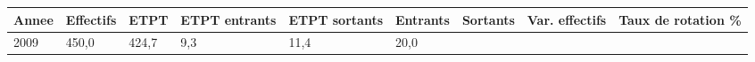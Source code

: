 \begin{longtable}[]{@{}lllllllll@{}}
\toprule
\begin{minipage}[b]{0.05\columnwidth}\raggedright
Annee\strut
\end{minipage} & \begin{minipage}[b]{0.08\columnwidth}\raggedright
Effectifs\strut
\end{minipage} & \begin{minipage}[b]{0.05\columnwidth}\raggedright
ETPT\strut
\end{minipage} & \begin{minipage}[b]{0.10\columnwidth}\raggedright
ETPT entrants\strut
\end{minipage} & \begin{minipage}[b]{0.10\columnwidth}\raggedright
ETPT sortants\strut
\end{minipage} & \begin{minipage}[b]{0.07\columnwidth}\raggedright
Entrants\strut
\end{minipage} & \begin{minipage}[b]{0.07\columnwidth}\raggedright
Sortants\strut
\end{minipage} & \begin{minipage}[b]{0.11\columnwidth}\raggedright
Var. effectifs\strut
\end{minipage} & \begin{minipage}[b]{0.14\columnwidth}\raggedright
Taux de rotation \%\strut
\end{minipage}\tabularnewline
\midrule
\endhead
\begin{minipage}[t]{0.05\columnwidth}\raggedright
2009\strut
\end{minipage} & \begin{minipage}[t]{0.08\columnwidth}\raggedright
450,0\strut
\end{minipage} & \begin{minipage}[t]{0.05\columnwidth}\raggedright
424,7\strut
\end{minipage} & \begin{minipage}[t]{0.10\columnwidth}\raggedright
9,3\strut
\end{minipage} & \begin{minipage}[t]{0.10\columnwidth}\raggedright
11,4\strut
\end{minipage} & \begin{minipage}[t]{0.07\columnwidth}\raggedright
20,0\strut
\end{minipage} & \begin{minipage}[t]{0.07\columnwidth}\raggedright

\end{minipage}
\end{longtable}
